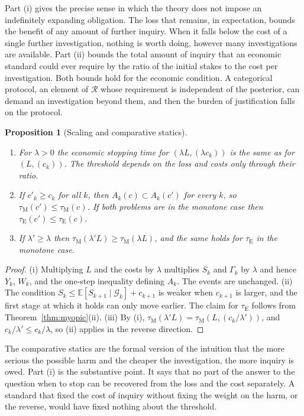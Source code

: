 \documentclass[11pt]{article}
\newcommand{\G}{\mathcal G}
\newcommand{\E}{\mathbb E}
\newcommand{\tE}{\tau_{\mathrm E}}
\newcommand{\tM}{\tau_{\mathrm M}}
\theoremstyle{plain}
\newtheorem{proposition}{Proposition}
\theoremstyle{definition}
\begin{document}
Part (i) gives the precise sense in which the theory does not impose an indefinitely expanding obligation. The loss that remains, in expectation, bounds the benefit of any amount of further inquiry. When it falls below the cost of a single further investigation, nothing is worth doing, however many investigations are available. Part (ii) bounds the total amount of inquiry that an economic standard could ever require by the ratio of the initial stakes to the cost per investigation. Both bounds hold for the economic condition. A categorical protocol, an element of $\mathcal R$ whose requirement is independent of the posterior, can demand an investigation beyond them, and then the burden of justification falls on the protocol.

\begin{proposition}[Scaling and comparative statics]\label{prop:scaling}
\begin{enumerate}[label=(\roman*),nosep]
\item For $\lambda>0$ the economic stopping time for $(\lambda L,(\lambda c_k))$ is the same as for $(L,(c_k))$. The threshold depends on the loss and costs only through their ratio.
\item If $c'_k\ge c_k$ for all $k$, then $A_k(c)\subset A_k(c')$ for every $k$, so $\tM(c')\le\tM(c)$. If both problems are in the monotone case then $\tE(c')\le\tE(c)$.
\item If $\lambda'\ge\lambda$ then $\tM(\lambda'L)\ge\tM(\lambda L)$, and the same holds for $\tE$ in the monotone case.
\end{enumerate}
\end{proposition}

\begin{proof}
(i) Multiplying $L$ and the costs by $\lambda$ multiplies $S_k$ and $\Gamma_k$ by $\lambda$ and hence $Y_k$, $W_k$, and the one-step inequality defining $A_k$. The events are unchanged. (ii) The condition $S_k\le\E[S_{k+1}\mid\G_k]+c_{k+1}$ is weaker when $c_{k+1}$ is larger, and the first stage at which it holds can only move earlier. The claim for $\tE$ follows from Theorem~\ref{thm:myopic}(ii). (iii) By (i), $\tM(\lambda'L)=\tM(L,(c_k/\lambda'))$, and $c_k/\lambda'\le c_k/\lambda$, so (ii) applies in the reverse direction.
\end{proof}

The comparative statics are the formal version of the intuition that the more serious the possible harm and the cheaper the investigation, the more inquiry is owed. Part (i) is the substantive point. It says that no part of the answer to the question when to stop can be recovered from the loss and the cost separately. A standard that fixed the cost of inquiry without fixing the weight on the harm, or the reverse, would have fixed nothing about the threshold.
\end{document}
